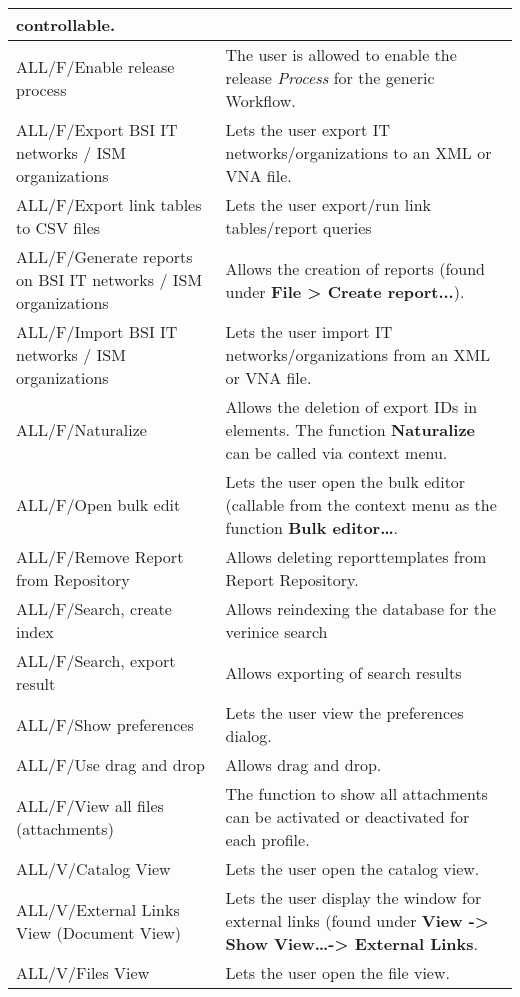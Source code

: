 \documentclass[a4paper,10pt]{book}
\begin{document}
\begin{longtable}{| p{5cm} | p{6cm} |}
controllable.  \\[10pt] \hline
ALL/F/Enable release process & The user is allowed to enable the
release \textit{Process} for the generic Workflow.  \\[10pt] \hline
ALL/F/Export BSI IT networks / ISM organizations & Lets the user export IT
networks/organizations to an XML or VNA file. \\[10pt] \hline
ALL/F/Export link tables to CSV files &  Lets the user export/run link tables/report queries \\[10pt] \hline
ALL/F/Generate reports on BSI IT networks / ISM organizations & Allows the
creation of reports (found under \textbf{File > Create report...}). \\[10pt]
\hline
ALL/F/Import BSI IT networks / ISM organizations & Lets the user import IT
networks/organizations from an XML or VNA file. \\[10pt] \hline
ALL/F/Naturalize & Allows the deletion of export IDs in elements. The function
\textbf{Naturalize} can be called via context menu. \\[10pt] \hline
ALL/F/Open bulk edit & Lets the user open the bulk editor (callable from the
context menu as the function \textbf{Bulk editor…}. \\[10pt] \hline
ALL/F/Remove Report from Repository & Allows deleting reporttemplates from
Report Repository. \\[10pt] \hline
ALL/F/Search, create index & Allows reindexing the database for the verinice
search \\[10pt] \hline
ALL/F/Search, export result & Allows exporting of search results \\[10pt] \hline
ALL/F/Show preferences & Lets the user view the preferences dialog. \\[10pt]
\hline
ALL/F/Use drag and drop & Allows drag and drop. \\[10pt] \hline
ALL/F/View all files \newline (attachments) & The function to show all
attachments can
be activated or deactivated for each profile. \\[10pt] \hline
ALL/V/Catalog View & Lets the user open the catalog view. \\[10pt] \hline
ALL/V/External Links View (Document View) & Lets the user display the window
for external links (found under \textbf{View -> Show View…-> External Links}.
\\[10pt] \hline
ALL/V/Files View & Lets the user open the file view.  \\[10pt] \hline

\end{longtable}
\end{document}

